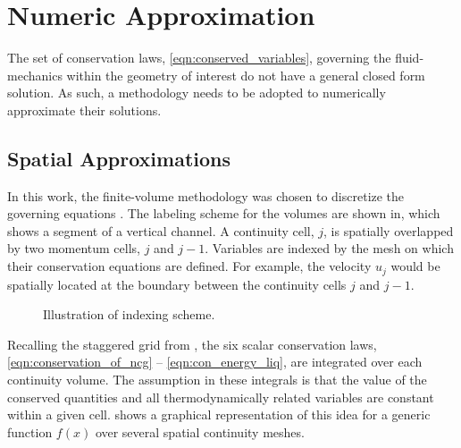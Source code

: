 \section{Numeric Approximation}
\label{sect:numeric_approximation}
The set of conservation laws, \eqref{eqn:conserved_variables}, governing the fluid-mechanics within the geometry of interest do not have a general closed form solution.
As such, a methodology needs to be adopted to numerically approximate their solutions.

\subsection{Spatial Approximations}
\label{subsect:spatial_approx}
In this work, the finite-volume methodology was chosen to discretize the governing equations \cite{LeVeque2002}.
The labeling scheme for the volumes are shown in, which shows a segment of a vertical channel.
A continuity cell, $j$, is spatially overlapped by two momentum cells, $j$ and $j-1$.
Variables are indexed by the mesh on which their conservation equations are defined.
For example, the velocity $u_j$ would be spatially located at the boundary between the continuity cells $j$ and $j-1$.

\begin{figure}[ht]
\caption{Illustration of indexing scheme.}
\label{fig:vertical_pipe_with_cells}
\begin{center}
\end{center}
\end{figure}

Recalling the staggered grid from , the six scalar conservation laws, \eqref{eqn:conservation_of_ncg} -- \eqref{eqn:con_energy_liq}, are integrated over each continuity volume.
The assumption in these integrals is that the value of the conserved quantities and all thermodynamically related variables are constant within a given cell.
 shows a graphical representation of this idea for a generic function $f(x)$ over several spatial continuity meshes.

